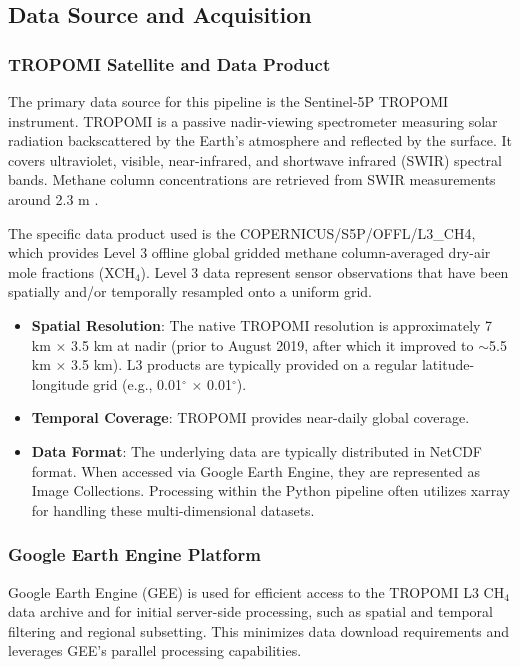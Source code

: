 \documentclass[12pt,a4paper]{article}
\begin{document}
\subsection{Data Source and Acquisition}
\subsubsection{TROPOMI Satellite and Data Product}
The primary data source for this pipeline is the Sentinel-5P TROPOMI instrument. TROPOMI is a passive nadir-viewing spectrometer measuring solar radiation backscattered by the Earth's atmosphere and reflected by the surface. It covers ultraviolet, visible, near-infrared, and shortwave infrared (SWIR) spectral bands. Methane column concentrations are retrieved from SWIR measurements around 2.3 \textmu m \citep{Hu2018TROPOMI}.

The specific data product used is the COPERNICUS/S5P/OFFL/L3\_CH4, which provides Level 3 offline global gridded methane column-averaged dry-air mole fractions (XCH$_4$). Level 3 data represent sensor observations that have been spatially and/or temporally resampled onto a uniform grid.
\begin{itemize}
    \item \textbf{Spatial Resolution}: The native TROPOMI resolution is approximately 7 km $\times$ 3.5 km at nadir (prior to August 2019, after which it improved to $\sim$5.5 km $\times$ 3.5 km). L3 products are typically provided on a regular latitude-longitude grid (e.g., 0.01$^{\circ}$ $\times$ 0.01$^{\circ}$).
    \item \textbf{Temporal Coverage}: TROPOMI provides near-daily global coverage.
    \item \textbf{Data Format}: The underlying data are typically distributed in NetCDF format. When accessed via Google Earth Engine, they are represented as Image Collections. Processing within the Python pipeline often utilizes xarray for handling these multi-dimensional datasets.
\end{itemize}

\subsubsection{Google Earth Engine Platform}
Google Earth Engine (GEE) is used for efficient access to the TROPOMI L3 CH$_4$ data archive and for initial server-side processing, such as spatial and temporal filtering and regional subsetting. This minimizes data download requirements and leverages GEE's parallel processing capabilities.
\end{document}
